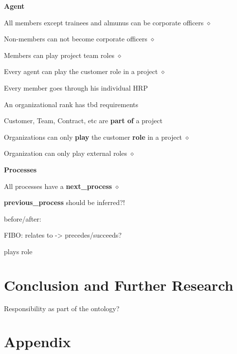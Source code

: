 \documentclass[a4paper, DIV=13, BCOR=0cm]{scrbook}
\begin{document}
\textbf{Agent}
\begin{compactitem}
	\item All members except trainees and almunus can be corporate officers $\diamond$
	\item Non-members can not become corporate officers $\diamond$
	\item Members can play project team roles $\diamond$
	\item Every agent can play the customer role in a project $\diamond$
	\item Every member goes through his individual HRP
	\item An organizational rank has tbd requirements
	\item Customer, Team, Contract, etc are \textbf{part of} a project
	\item Organizations can only \textbf{play} the customer \textbf{role} in a project $\diamond$
	\item Organization can only play external roles $\diamond$
\end{compactitem}

\textbf{Processes}
\begin{compactitem}
	\item All processes have a \textbf{next\_process} $\diamond$
	\item \textbf{previous\_process} should be inferred?!
	\item
\end{compactitem}

before/after:
\begin{compactitem}
	\item FIBO: relates to -> precedes/succeeds?
	\item plays role
\end{compactitem}


\chapter{Conclusion and Further Research }

Responsibility as part of the ontology?

\appendix
\chapter{Appendix}
\end{document}
